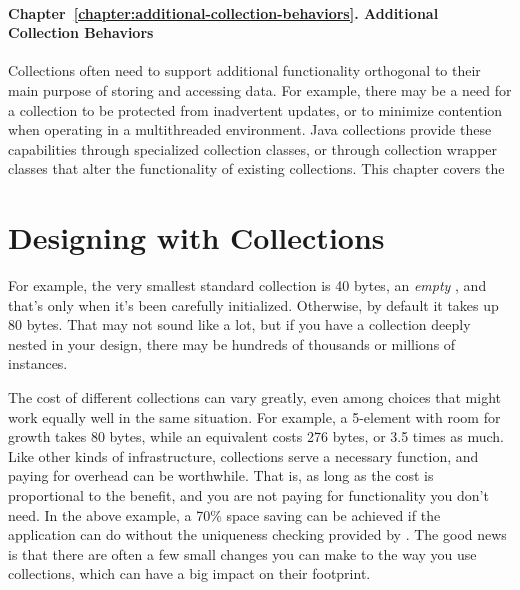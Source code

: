 \paragraph{Chapter~\ref{chapter:additional-collection-behaviors}. Additional
Collection Behaviors} Collections often need to support additional functionality
orthogonal to their main purpose of storing and accessing data.  For example,
there may be a need for a collection to be protected from inadvertent
updates, or to minimize contention when operating in a
multithreaded environment.  Java collections provide these capabilities through
specialized collection classes, or through collection wrapper classes that alter
the functionality of existing collections.  This chapter covers the 

\section{Designing with Collections}
\label{sec:designing-with-collections}

For example,
the very smallest standard collection is 40 bytes, an \emph{empty}
, and that's only when it's been carefully initialized. 
Otherwise, by default it takes up 80 bytes. That may not sound like a lot,
but if you have a collection deeply nested in your design, there may be
hundreds of thousands or millions of instances.

The cost of different collections can vary greatly, even among choices that
might work equally well in the same situation. For example, a 5-element 
with room for growth takes 80 bytes, while an equivalent  costs 276 bytes, or 3.5 times as much. 
Like other kinds of infrastructure, collections serve a necessary
function, and paying for overhead can be worthwhile.  That is, as long as
the cost is proportional to the benefit, and you are not paying
for functionality you don't need. In the above example, a 70\% space saving
can be achieved if the application can do without the uniqueness checking
provided by .  The good news is that there are often a few small
changes you can make to the way you use collections, which can have a big
impact on their footprint.

